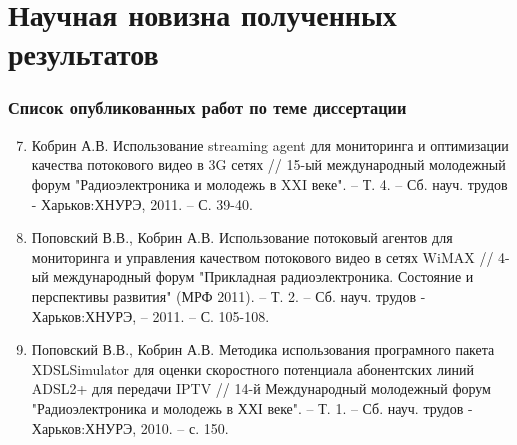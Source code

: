 \documentclass[10pt,pdf,hyperref={unicode}]{beamer}
\begin{document}
\section{Научная новизна полученных результатов}

\begin{frame}
\frametitle{Список опубликованных работ по теме диссертации}
{\small
\begin{enumerate}
\setcounter{enumi}{6}
\item Кобрин А.В. Использование streaming agent для мониторинга и оптимизации качества потокового видео в 3G сетях // 15-ый международный молодежный форум "Радиоэлектроника и молодежь в XXI веке". – Т. 4. – Сб. науч. трудов - Харьков:ХНУРЭ, 2011. – С. 39-40.
\item Поповский В.В., Кобрин А.В. Использование потоковый агентов для мониторинга и управления качеством потокового видео в сетях WiMAX // 4-ый международный форум "Прикладная радиоэлектроника. Состояние и перспективы развития" (МРФ 2011). – Т. 2. – Сб. науч. трудов - Харьков:ХНУРЭ, – 2011. – С. 105-108.
\item Поповский В.В., Кобрин А.В. Методика использования програмного пакета XDSLSimulator для оценки скоростного потенциала абонентских линий ADSL2+ для передачи IPTV // 14-й Международный молодежный форум "Радиоэлектроника и молодежь в ХХІ веке". – Т. 1. – Сб. науч. трудов - Харьков:ХНУРЭ, 2010. – с. 150.
\end{enumerate}
}
\end{frame}
\end{document}
